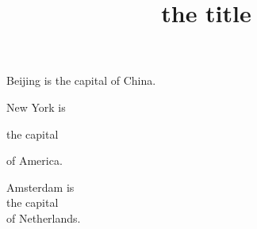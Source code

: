 \documentclass{article}
\title{the title}
\begin{document}
\maketitle
Beijing is
the capital
of China.

New York is

the capital

of America.

Amsterdam is \\ the capital \\
of Netherlands.
\end{document}
